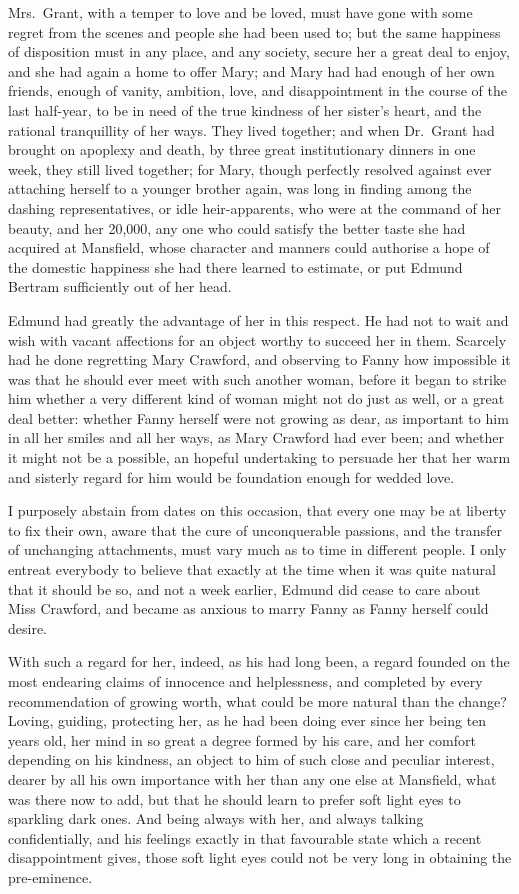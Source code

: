 \documentclass{article}
\begin{document}
Mrs.\ Grant, with a temper to love and be loved, must have
gone with some regret from the scenes and people she
had been used to; but the same happiness of disposition
must in any place, and any society, secure her a great
deal to enjoy, and she had again a home to offer Mary;
and Mary had had enough of her own friends, enough of vanity,
ambition, love, and disappointment in the course of the
last half-year, to be in need of the true kindness of her
sister's heart, and the rational tranquillity of her ways.
They lived together; and when Dr.\ Grant had brought
on apoplexy and death, by three great institutionary
dinners in one week, they still lived together; for Mary,
though perfectly resolved against ever attaching herself
to a younger brother again, was long in finding among
the dashing representatives, or idle heir-apparents,
who were at the command of her beauty, and her 20,000,
any one who could satisfy the better taste she had acquired
at Mansfield, whose character and manners could authorise
a hope of the domestic happiness she had there learned
to estimate, or put Edmund Bertram sufficiently out of her head.

Edmund had greatly the advantage of her in this respect.
He had not to wait and wish with vacant affections for an
object worthy to succeed her in them.  Scarcely had he
done regretting Mary Crawford, and observing to Fanny
how impossible it was that he should ever meet with such
another woman, before it began to strike him whether
a very different kind of woman might not do just as well,
or a great deal better:  whether Fanny herself were not
growing as dear, as important to him in all her smiles
and all her ways, as Mary Crawford had ever been;
and whether it might not be a possible, an hopeful
undertaking to persuade her that her warm and sisterly
regard for him would be foundation enough for wedded love.

I purposely abstain from dates on this occasion,
that every one may be at liberty to fix their own,
aware that the cure of unconquerable passions, and the
transfer of unchanging attachments, must vary much as
to time in different people.  I only entreat everybody
to believe that exactly at the time when it was quite
natural that it should be so, and not a week earlier,
Edmund did cease to care about Miss Crawford, and became
as anxious to marry Fanny as Fanny herself could desire.

With such a regard for her, indeed, as his had long been,
a regard founded on the most endearing claims of innocence
and helplessness, and completed by every recommendation
of growing worth, what could be more natural than
the change?  Loving, guiding, protecting her, as he
had been doing ever since her being ten years old,
her mind in so great a degree formed by his care,
and her comfort depending on his kindness, an object to him
of such close and peculiar interest, dearer by all his
own importance with her than any one else at Mansfield,
what was there now to add, but that he should learn
to prefer soft light eyes to sparkling dark ones.
And being always with her, and always talking confidentially,
and his feelings exactly in that favourable state
which a recent disappointment gives, those soft light
eyes could not be very long in obtaining the pre-eminence.
\end{document}
